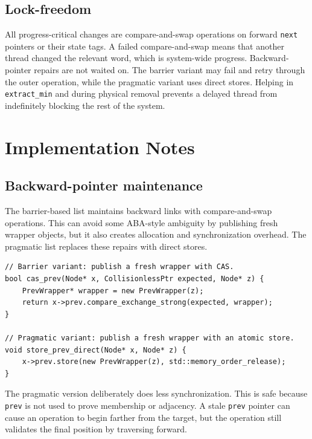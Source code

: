 \documentclass[a4paper,11pt]{article}
\newcommand{\code}[1]{\texttt{#1}}
\begin{document}
\subsection{Lock-freedom}

All progress-critical changes are compare-and-swap operations on forward \code{next} pointers or their state tags. A failed compare-and-swap means that another thread changed the relevant word, which is system-wide progress. Backward-pointer repairs are not waited on. The barrier variant may fail and retry through the outer operation, while the pragmatic variant uses direct stores. Helping in \code{extract\_min} and during physical removal prevents a delayed thread from indefinitely blocking the rest of the system.

\section{Implementation Notes}

\subsection{Backward-pointer maintenance}

The barrier-based list maintains backward links with compare-and-swap operations. This can avoid some ABA-style ambiguity by publishing fresh wrapper objects, but it also creates allocation and synchronization overhead. The pragmatic list replaces these repairs with direct stores.

\begin{lstlisting}[style=cpp,caption={Barrier-based and pragmatic backward-pointer repair.}]
// Barrier variant: publish a fresh wrapper with CAS.
bool cas_prev(Node* x, CollisionlessPtr expected, Node* z) {
    PrevWrapper* wrapper = new PrevWrapper(z);
    return x->prev.compare_exchange_strong(expected, wrapper);
}

// Pragmatic variant: publish a fresh wrapper with an atomic store.
void store_prev_direct(Node* x, Node* z) {
    x->prev.store(new PrevWrapper(z), std::memory_order_release);
}
\end{lstlisting}

The pragmatic version deliberately does less synchronization. This is safe because \code{prev} is not used to prove membership or adjacency. A stale \code{prev} pointer can cause an operation to begin farther from the target, but the operation still validates the final position by traversing forward.
\end{document}
